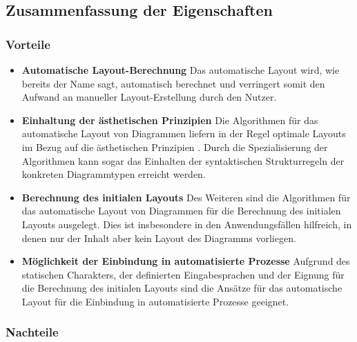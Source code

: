 \subsection{Zusammenfassung der Eigenschaften}
\label{subsec:summary-automatic-layout}

\subsubsection{Vorteile}

\begin{itemize}

\item
\textbf{Automatische Layout-Berechnung}
Das automatische Layout wird, wie bereits der Name sagt, automatisch berechnet und verringert somit den Aufwand an manueller Layout-Erstellung durch den Nutzer.

\item
\textbf{Einhaltung der ästhetischen Prinzipien}
Die Algorithmen für das automatische Layout von Diagrammen liefern in der Regel optimale Layouts im Bezug auf die ästhetischen Prinzipien \cite{Maier12A-Pattern-based}. Durch die Spezialisierung der Algorithmen kann sogar das Einhalten der syntaktischen Strukturregeln der konkreten Diagrammtypen erreicht werden.

\item
\textbf{Berechnung des initialen Layouts}
Des Weiteren sind die Algorithmen für das automatische Layout von Diagrammen für die Berechnung des initialen Layouts ausgelegt. Dies ist insbesondere in den Anwendungsfällen hilfreich, in denen nur der Inhalt aber kein Layout des Diagramms vorliegen.

\item
\textbf{Möglichkeit der Einbindung in automatisierte Prozesse}
Aufgrund des statischen Charakters, der definierten Eingabesprachen und der Eignung für die Berechnung des initialen Layouts sind die Ansätze für das automatische Layout für die Einbindung in automatisierte Prozesse geeignet.

\end{itemize}

\subsubsection{Nachteile}

